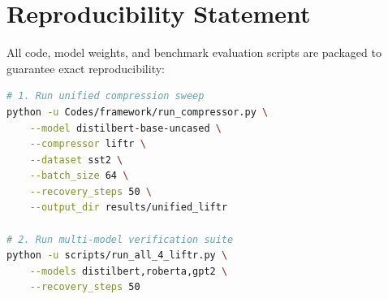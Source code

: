 \section{Reproducibility Statement}
All code, model weights, and benchmark evaluation scripts are packaged to guarantee exact reproducibility:
\begin{lstlisting}[language=bash]
# 1. Run unified compression sweep
python -u Codes/framework/run_compressor.py \
    --model distilbert-base-uncased \
    --compressor liftr \
    --dataset sst2 \
    --batch_size 64 \
    --recovery_steps 50 \
    --output_dir results/unified_liftr

# 2. Run multi-model verification suite
python -u scripts/run_all_4_liftr.py \
    --models distilbert,roberta,gpt2 \
    --recovery_steps 50
\end{lstlisting}
